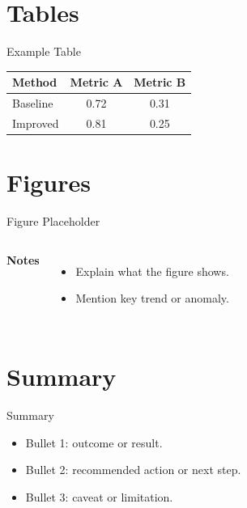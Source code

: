 \documentclass[aspectratio=169,10pt]{beamer}
\begin{document}
\section{Tables}
\begin{frame}[t]{Example Table}
\begin{table}
\centering
\begin{tabular}{lcc}
\toprule
Method & Metric A & Metric B \\
\midrule
Baseline & 0.72 & 0.31 \\
Improved & 0.81 & 0.25 \\
\bottomrule
\end{tabular}
\end{table}
\end{frame}

\section{Figures}
\begin{frame}[t]{Figure Placeholder}
\begin{columns}[T,onlytextwidth]

\textbf{Notes}
\begin{itemize}
\item Explain what the figure shows.
\item Mention key trend or anomaly.
\end{itemize}
\end{columns}
\end{frame}

\section{Summary}
\begin{frame}[t]{Summary}
\begin{itemize}
\item Bullet 1: outcome or result.
\item Bullet 2: recommended action or next step.
\item Bullet 3: caveat or limitation.
\end{itemize}
\end{frame}
\end{document}
